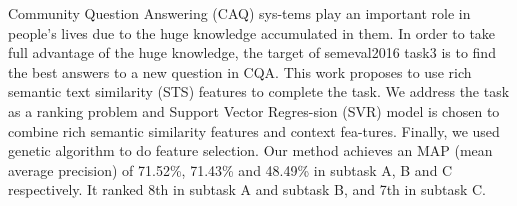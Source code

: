 Community Question Answering (CAQ) sys-tems play an important role in people's lives due to the huge knowledge accumulated in them. In order to take full advantage of the huge knowledge, the target of semeval2016 task3 is to find the best answers to a new question in CQA. This work proposes to use rich semantic text similarity (STS) features to complete the task. We address the task as a ranking problem and Support Vector Regres-sion (SVR) model is chosen to combine rich semantic similarity features and context fea-tures. Finally, we used genetic algorithm to do feature selection. Our method achieves an MAP (mean average precision) of 71.52\%, 71.43\% and 48.49\% in subtask A, B and C respectively.  It ranked 8th in subtask A and subtask B, and 7th  in subtask C.
